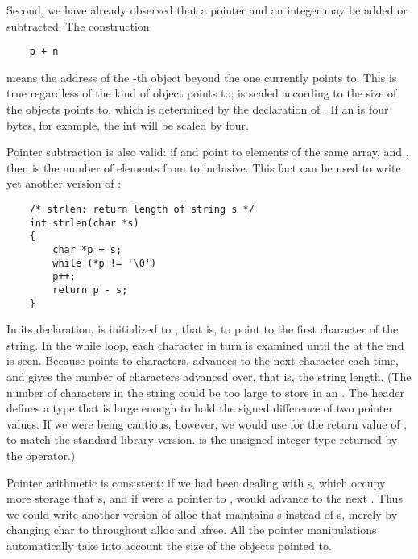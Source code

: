 Second, we have already observed that a pointer and an integer may be added or subtracted.
The construction
\begin{lstlisting}
    p + n
\end{lstlisting}
means the address of the -th object beyond the one  currently points to.
This is true regardless of the kind of object  points to;  is scaled according to the size of the objects  points to, which is determined by the declaration of .
If an  is four bytes, for example, the int will be scaled by four.

Pointer subtraction is also valid: if  and  point to elements of the same array, and , then  is the number of elements from  to  inclusive.
This fact can be used to write yet another version of :

\begin{lstlisting}
    /* strlen: return length of string s */
    int strlen(char *s)
    {
        char *p = s;
        while (*p != '\0')
        p++;
        return p - s;
    }
\end{lstlisting}

In its declaration,  is initialized to , that is, to point to the first character of the string. In the while loop, each character in turn is examined until the  at the end is seen.
Because  points to characters,  advances  to the next character each time, and  gives the number of characters advanced over, that is, the string length.
(The number of characters in the string could be too large to store in an . The header  defines a type  that is large enough to hold the signed difference of two pointer values.
If we were being cautious, however, we would use  for the return value of , to match the standard library version.  is the unsigned integer type returned by the  operator.)

Pointer arithmetic is consistent: if we had been dealing with s, which occupy more storage that s, and if  were a pointer to ,  would advance to the next .
Thus we could write another version of alloc that maintains s instead of s, merely by changing char to  throughout alloc and afree.
All the pointer manipulations automatically take into account the size of the objects pointed to.


